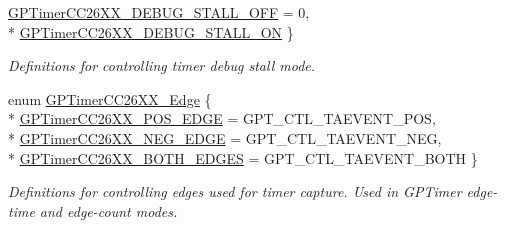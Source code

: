 \begin{DoxyCompactItemize}
\hyperlink{_g_p_timer_c_c26_x_x_8h_ab4c80c79c9acaf8e482e8244adbae73ea1aca5e7c45ce80046cc86c309b1500b3}{G\+P\+Timer\+C\+C26\+X\+X\+\_\+\+D\+E\+B\+U\+G\+\_\+\+S\+T\+A\+L\+L\+\_\+\+O\+F\+F} = 0, 
\\*
\hyperlink{_g_p_timer_c_c26_x_x_8h_ab4c80c79c9acaf8e482e8244adbae73ea78ecad7414438f969450881393850b8c}{G\+P\+Timer\+C\+C26\+X\+X\+\_\+\+D\+E\+B\+U\+G\+\_\+\+S\+T\+A\+L\+L\+\_\+\+O\+N}
 \}
\begin{DoxyCompactList}\small\item\em Definitions for controlling timer debug stall mode. \end{DoxyCompactList}\item 
enum \hyperlink{_g_p_timer_c_c26_x_x_8h_ac72f25419727329702ec162a2b6b9151}{G\+P\+Timer\+C\+C26\+X\+X\+\_\+\+Edge} \{ \\*
\hyperlink{_g_p_timer_c_c26_x_x_8h_ac72f25419727329702ec162a2b6b9151a0dda532d331ac235bead20fad3975f4f}{G\+P\+Timer\+C\+C26\+X\+X\+\_\+\+P\+O\+S\+\_\+\+E\+D\+G\+E} = G\+P\+T\+\_\+\+C\+T\+L\+\_\+\+T\+A\+E\+V\+E\+N\+T\+\_\+\+P\+O\+S, 
\\*
\hyperlink{_g_p_timer_c_c26_x_x_8h_ac72f25419727329702ec162a2b6b9151a2189f990a1c45892bdfcb31855d7d98f}{G\+P\+Timer\+C\+C26\+X\+X\+\_\+\+N\+E\+G\+\_\+\+E\+D\+G\+E} = G\+P\+T\+\_\+\+C\+T\+L\+\_\+\+T\+A\+E\+V\+E\+N\+T\+\_\+\+N\+E\+G, 
\\*
\hyperlink{_g_p_timer_c_c26_x_x_8h_ac72f25419727329702ec162a2b6b9151a2219c0e15065a692a80b4049036cd20a}{G\+P\+Timer\+C\+C26\+X\+X\+\_\+\+B\+O\+T\+H\+\_\+\+E\+D\+G\+E\+S} = G\+P\+T\+\_\+\+C\+T\+L\+\_\+\+T\+A\+E\+V\+E\+N\+T\+\_\+\+B\+O\+T\+H
 \}
\begin{DoxyCompactList}\small\item\em Definitions for controlling edges used for timer capture. Used in G\+P\+Timer edge-\/time and edge-\/count modes. \end{DoxyCompactList}\end{DoxyCompactItemize}
